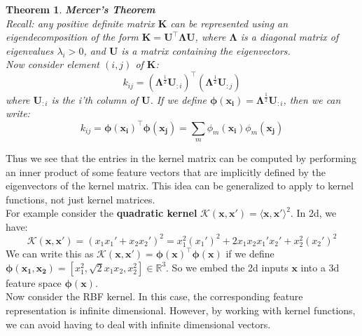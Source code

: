 \documentclass[twoside]{article}
\newcounter{lecnum}
\newtheorem{theorem}{Theorem}[lecnum]
\begin{document}
\begin{theorem}{\textbf{Mercer's  Theorem}\\}
Recall: any positive definite matrix $\boldsymbol{K}$ can be represented using an eigendecomposition of the form $\boldsymbol{K = U^\intercal\Lambda U}$, where $\boldsymbol{\Lambda}$ is a diagonal matrix of eigenvalues $\lambda_i > 0$, and $\boldsymbol{U}$ is a matrix containing the eigenvectors.\\
Now consider element $(i, j)$ of $\boldsymbol{K}$:
\begin{equation*}
    k_{ij} = (\boldsymbol{\Lambda}^\frac{1}{2}\boldsymbol{U}_{:i})^\intercal(\boldsymbol{\Lambda}^\frac{1}{2}\boldsymbol{U}_{:j})
\end{equation*}
where $\boldsymbol{U}_{:i}$ is the \textit{i}'th column of $\boldsymbol{U}$. If we define $\boldsymbol{\phi(x_i)} = \boldsymbol{\Lambda}^\frac{1}{2}\boldsymbol{U}_{:i}$, then we can write:
\begin{equation*}
    k_{ij} = \boldsymbol{\phi(x_i)}^\intercal \boldsymbol{\phi(x_j)} = \sum\limits_m \phi_m (\boldsymbol{x_i})\phi_m(\boldsymbol{x_j})
\end{equation*}
\end{theorem}
Thus we see that the entries in the kernel matrix can be computed by performing an inner product of some feature vectors that are implicitly defined by the eigenvectors of the kernel matrix. This idea can be generalized to apply to kernel functions, not just kernel matrices.\\
For example consider the \textbf{quadratic kernel} $\mathcal{K}(\boldsymbol{x}, \boldsymbol{x'}) = \langle\boldsymbol{x}, \boldsymbol{x'}\rangle^2$. In 2d, we have:
\begin{equation*}
    \mathcal{K}(\boldsymbol{x}, \boldsymbol{x'}) = (x_1x_1' + x_2x_2')^2 = x_1^2(x_1')^2 + 2x_1x_2x_1'x_2' + x_2^2(x_2')^2
\end{equation*}
We can write this as $\mathcal{K}(\boldsymbol{x}, \boldsymbol{x'}) = \boldsymbol{\phi(x)}^\intercal\boldsymbol{\phi(x)}$ if we define $\boldsymbol{\phi(x_1, x_2)} = [x_1^2, \sqrt{2}x_1x_2, x_2^2] \in \mathbb{R}^3$. So we embed the 2d inputs $\boldsymbol{x}$ into a 3d feature space $\boldsymbol{\phi(x)}$.\\
Now consider the RBF kernel. In this case, the corresponding feature representation is infinite dimensional. However, by working with kernel functions, we can avoid having to deal with infinite dimensional vectors.
\newpage
\end{document}
